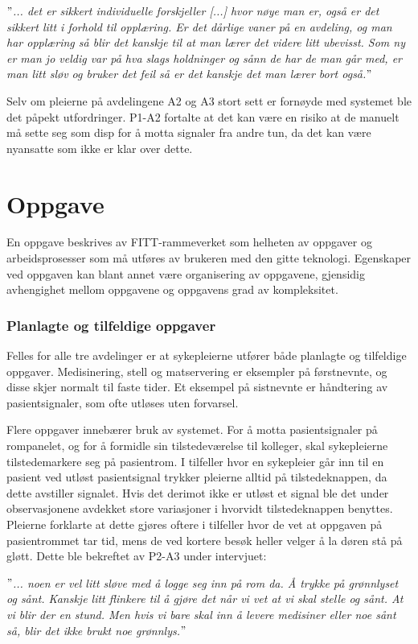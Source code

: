 \noindent
\textit{$"$... det er sikkert individuelle forskjeller [...] hvor nøye man er, også er det sikkert litt i forhold til opplæring. Er det dårlige vaner på en avdeling, og man har opplæring så blir det kanskje til at man lærer det videre litt ubevisst. Som ny er man jo veldig var på hva slags holdninger og sånn de har de man går med, er man litt sløv og bruker det feil så er det kanskje det man lærer bort også.$"$}

\noindent
Selv om pleierne på avdelingene A2 og A3 stort sett er fornøyde med systemet ble det påpekt utfordringer. P1-A2 fortalte at det kan være en risiko at de manuelt må sette seg som disp for å motta signaler fra andre tun, da det kan være nyansatte som ikke er klar over dette.  

\section{Oppgave}
En oppgave beskrives av FITT-rammeverket som helheten av oppgaver og arbeidsprosesser som må utføres av brukeren med den gitte teknologi. Egenskaper ved oppgaven kan blant annet være organisering av oppgavene, gjensidig avhengighet mellom oppgavene og oppgavens grad av kompleksitet.

\subsubsection{Planlagte og tilfeldige oppgaver}
Felles for alle tre avdelinger er at sykepleierne utfører både planlagte og tilfeldige oppgaver. Medisinering, stell og matservering er eksempler på førstnevnte, og disse skjer normalt til faste tider. Et eksempel på sistnevnte er håndtering av pasientsignaler, som ofte utløses uten forvarsel.  

\noindent
Flere oppgaver innebærer bruk av systemet. For å motta pasientsignaler på rompanelet, og for å formidle sin tilstedeværelse til kolleger, skal sykepleierne tilstedemarkere seg på pasientrom. I tilfeller hvor en sykepleier går inn til en pasient ved utløst pasientsignal trykker pleierne alltid på tilstedeknappen, da dette avstiller signalet. Hvis det derimot ikke er utløst et signal ble det under observasjonene avdekket store variasjoner i hvorvidt tilstedeknappen benyttes. Pleierne forklarte at dette gjøres oftere i tilfeller hvor de vet at oppgaven på pasientrommet tar tid, mens de ved kortere besøk heller velger å la døren stå på gløtt. Dette ble bekreftet av P2-A3 under intervjuet: 

\noindent
\textit{$"$... noen er vel litt sløve med å logge seg inn på rom da. Å trykke på grønnlyset og sånt. Kanskje litt flinkere til å gjøre det når vi vet at vi skal stelle og sånt. At vi blir der en stund. Men hvis vi bare skal inn å levere medisiner eller noe sånt så, blir det ikke brukt noe grønnlys.$"$}

